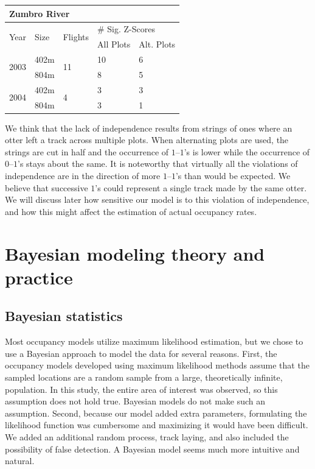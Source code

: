 \documentclass[12pt]{article}
\begin{document}
\begin{table}
    \begin{center}
    \begin{tabular}{|l|l|l|l|l|}
        \hline
        \multicolumn{5}{|l|}{\textbf{Zumbro River}} \\
        \hline
        \multirow{2}{*}{Year} & \multirow{2}{*}{Size} & \multirow{2}{*}{Flights}
        & \multicolumn{2}{|l|}{\# Sig. Z-Scores} \\
        \cline{4-5}
        & & & All Plots & Alt. Plots \\
        \hline
        \multirow{2}{*}{2003} & 402m & \multirow{2}{*}{11} & 10 & 6 \\
        \cline{2-2} \cline{4-5}
        & 804m & & 8 & 5 \\
        \hline
        \multirow{2}{*}{2004} & 402m & \multirow{2}{*}{4} & 3 & 3 \\
        \cline{2-2} \cline{4-5}
        & 804m & & 3 & 1 \\
        \hline
    \end{tabular}
    \end{center}
    \end{table}

    We think that the lack of independence results from strings of ones where an
    otter left a track across multiple plots. When alternating plots are used,
    the strings are cut in half and the occurrence of \(1\)--\(1\)'s is lower
    while the occurrence of \(0\)--\(1\)'s stays about the same. It is
    noteworthy that virtually all the violations of independence are in the
    direction of more \(1\)--\(1\)'s than would be expected. We believe that
    successive \(1\)'s could represent a single track made by the same otter. We
    will
    discuss later how sensitive our model is to this violation of independence,
    and how this might affect the estimation of actual occupancy rates.

\section{Bayesian modeling theory and practice}

    \subsection{Bayesian statistics}
    Most occupancy models utilize maximum likelihood estimation, but we chose
    to use a Bayesian approach to model the data for several reasons.
    First, the occupancy models developed using maximum likelihood methods
    assume that the sampled locations are a random sample from a large,
    theoretically infinite, population.  In this study, the entire area of
    interest was observed, so this assumption does not hold true.  Bayesian
    models do not make such an assumption.  Second, because our model added
    extra
    parameters, formulating the likelihood function was cumbersome and
    maximizing
    it would have been difficult.  We added an additional random process, track
    laying, and also included the possibility of false detection.  A Bayesian
    model seems much more intuitive and natural.
\end{document}
